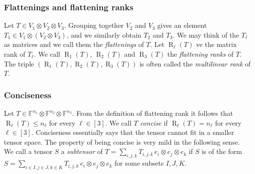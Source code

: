 \documentclass[11pt]{article}
\DeclareMathOperator{\tensorrank}{R}
\newcommand{\FF}{\mathbb{F}}
\begin{document}
\subsubsection*{Flattenings and flattening ranks}
Let $T \in V_1 \otimes V_2 \otimes V_3$. Grouping together $V_2$ and $V_3$ gives an element  $T_{1} \in V_1 \otimes (V_2 \otimes V_3)$, and we similarly obtain $T_2$ and $T_3$. %
We may think of the $T_\ell$ as matrices and we call them 
the \emph{flattenings} of $T$.
Let $\tensorrank_{\ell}(T)$ ve the matrix rank of $T_{\ell}$. We call $\tensorrank_1(T)$, $\tensorrank_2(T)$ and $\tensorrank_3(T)$ 
the \emph{flattening ranks} of $T$.
The triple $(\tensorrank_1(T), \tensorrank_2(T), \tensorrank_3(T))$ is often called the \emph{multilinear rank} of $T$. 


\subsubsection*{Conciseness} 
Let $T \in \FF^{n_1} \otimes \FF^{n_2} \otimes \FF^{n_3}$. From the definition of flattening rank it follows that $\tensorrank_\ell(T) \leq n_\ell$ for every $\ell \in [3]$. We call $T$ \emph{concise} if $\tensorrank_\ell(T) = n_\ell$  for every~$\ell \in [3]$. Conciseness essentially says that the tensor cannot fit in a smaller tensor space. The property of being concise is very mild in the following sense. We call a tensor $S$ a \emph{subtensor} of $T = \sum_{i,j,k} T_{i,j,k}\, e_i \otimes e_j \otimes e_k$ if $S$ is of the form $S = \sum_{i\in I,j\in J,k\in K} T_{i,j,k}\, e_i \otimes e_j \otimes e_k$ for some subsets $I,J,K$.
\end{document}
